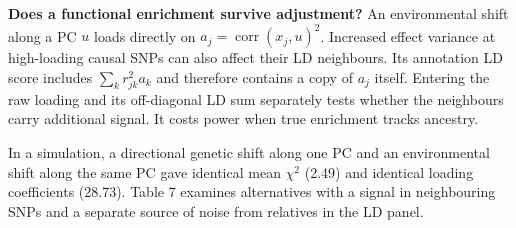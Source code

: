 \documentclass[11pt,a4paper]{article}
\begin{document}
\textbf{Does a functional enrichment survive adjustment?} An environmental shift along a PC \(u\) loads directly on \(a_j=\operatorname{corr}(x_j,u)^2\). Increased effect variance at high-loading causal SNPs can also affect their LD neighbours. Its annotation LD score includes \(\sum_k r_{jk}^2 a_k\) and therefore contains a copy of \(a_j\) itself. Entering the raw loading and its off-diagonal LD sum separately tests whether the neighbours carry additional signal. It costs power when true enrichment tracks ancestry.

In a simulation, a directional genetic shift along one PC and an environmental shift along the same PC gave identical mean \(\chi^2\) (2.49) and identical loading coefficients (28.73). Table 7 examines alternatives with a signal in neighbouring SNPs and a separate source of noise from relatives in the LD panel.
\end{document}

